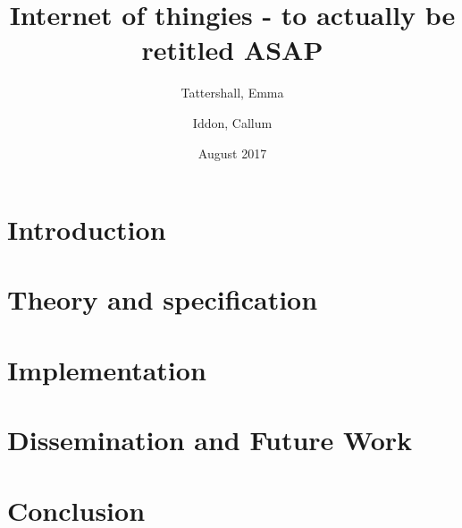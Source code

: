 \documentclass{article}
\title{Internet of thingies - to actually be retitled ASAP}
\author{
  Tattershall, Emma
  \and
  Iddon, Callum
}
\date{August 2017}
\begin{document}
\maketitle

\section{Introduction}


\section{Theory and specification}


\section{Implementation}


\section{Dissemination and Future Work}




\section{Conclusion}

\end{document}
